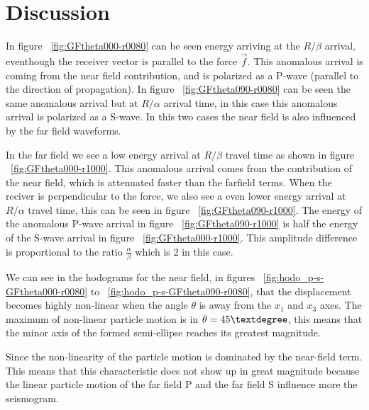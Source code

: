 \section{Discussion}

In figure ~\ref{fig:GFtheta000-r0080} can be seen energy arriving at the $R/\beta$ arrival, eventhough the receiver vector is parallel
to the force $\vec{f}$. This anomalous arrival is coming from the near field contribution, and is polarized as a P-wave (parallel to the
direction of propagation). In figure ~\ref{fig:GFtheta090-r0080} can be seen the same anomalous arrival but at $R/\alpha$ arrival time, 
in this case this anomalous arrival is polarized as a S-wave. In this two cases the near field is also influenced by the far field waveforms.

In the far field we see a low energy arrival at $R/\beta$ travel time as shown in figure ~\ref{fig:GFtheta000-r1000}. This anomalous
arrival comes from the contribution of the near field, which is attenuated faster than the farfield terms. When the reciver is perpendicular
to the force, we also see a even lower energy arrival at $R/\alpha$ travel time, this can be seen in figure ~\ref{fig:GFtheta090-r1000}. 
The energy of the anomalous P-wave arrival in figure ~\ref{fig:GFtheta090-r1000} is half the energy of the S-wave arrival in figure
~\ref{fig:GFtheta000-r1000}. This amplitude difference is proportional to the ratio $\frac{\alpha}{\beta}$ which is $2$ in this case.


We can see in the hodograms for the near field, in figures ~\ref{fig:hodo_p-s-GFtheta000-r0080} to ~\ref{fig:hodo_p-s-GFtheta090-r0080}, 
that the displacement becomes highly non-linear when the angle $\theta$ is away from the $x_1$ and $x_3$ axes. The maximum of non-linear
 particle motion is in $\theta=45\textdegree$, this means that the minor axis of the formed semi-ellipse reaches its greatest magnitude.

Since the non-linearity of the particle motion is dominated by the near-field term. This means that this characteristic does not show up in great 
magnitude because the linear particle motion of the far field P and the far field S influence more the seismogram.

